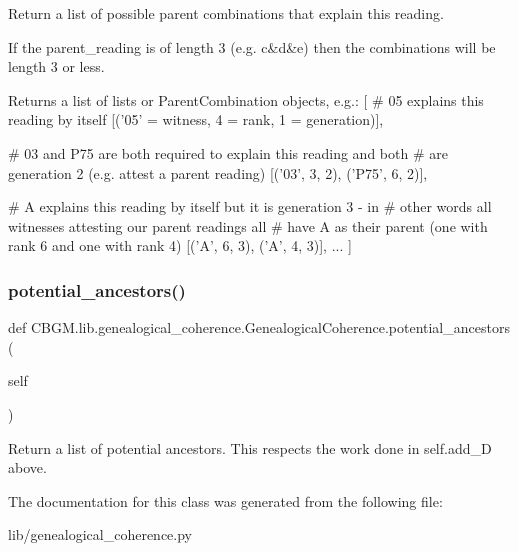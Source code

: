 \begin{DoxyVerb}Return a list of possible parent combinations that explain this reading.

If the parent_reading is of length 3 (e.g. c&d&e) then the combinations
will be length 3 or less.

Returns a list of lists or ParentCombination objects, e.g.:
    [
     # 05 explains this reading by itself
     [('05' = witness, 4 = rank, 1 = generation)],

     # 03 and P75 are both required to explain this reading and both
     # are generation 2 (e.g. attest a parent reading)
     [('03', 3, 2), ('P75', 6, 2)],

     # A explains this reading by itself but it is generation 3 - in
     # other words all witnesses attesting our parent readings all
     # have A as their parent (one with rank 6 and one with rank 4)
     [('A', 6, 3), ('A', 4, 3)],
     ...
     ]
\end{DoxyVerb}
 \mbox{\label{classCBGM_1_1lib_1_1genealogical__coherence_1_1GenealogicalCoherence_af1572e7d21def128aaacac243d3ec348}} 
\subsubsection{\texorpdfstring{potential\+\_\+ancestors()}{potential\_ancestors()}}
{\footnotesize\ttfamily def C\+B\+G\+M.\+lib.\+genealogical\+\_\+coherence.\+Genealogical\+Coherence.\+potential\+\_\+ancestors (\begin{DoxyParamCaption}\item[{}]{self }\end{DoxyParamCaption})}

\begin{DoxyVerb}Return a list of potential ancestors. This respects the work done in self.add_D above.
\end{DoxyVerb}
 

The documentation for this class was generated from the following file\+:\begin{DoxyCompactItemize}
\item 
lib/genealogical\+\_\+coherence.\+py\end{DoxyCompactItemize}
